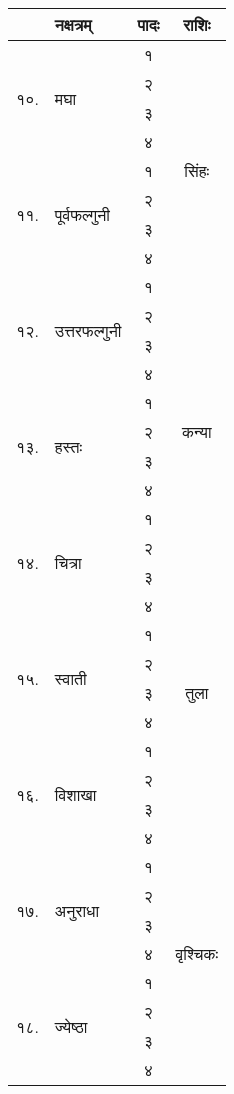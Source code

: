{\begin{tabular}{|l@{~}l|>{\tiny}c|c|}
\hline
& नक्षत्रम् & \small{पादः} & राशिः\\\hline
\multirow{4}{*}{१०.} & \multirow{4}{*}{मघा}                      & १&  \multirow{9}{*}{सिंहः}\\
&& २& \\
&& ३& \\
&& ४& \\
\cline{1-3}\multirow{4}{*}{११.} & \multirow{4}{*}{पूर्वफल्गुनी}             & १&  \\
&& २& \\
&& ३& \\
&& ४& \\
\cline{1-3}\multirow{4}{*}{१२.} & \multirow{4}{*}{उत्तरफल्गुनी}             & १&  \\
\cline{3-4} & & २&  \multirow{9}{*}{कन्या} \\
&& ३& \\
&& ४& \\
\cline{1-3}\multirow{4}{*}{१३.} & \multirow{4}{*}{हस्तः}                    & १&  \\
&& २& \\
&& ३& \\
&& ४& \\
\cline{1-3}\multirow{4}{*}{१४.} & \multirow{4}{*}{चित्रा}                   & १&   \\
&& २& \\
\cline{3-4} & & ३&  \multirow{9}{*}{तुला} \\
&& ४& \\
\cline{1-3}\multirow{4}{*}{१५.} & \multirow{4}{*}{स्वाती}                   & १&   \\
&& २& \\
&& ३& \\
&& ४& \\
\cline{1-3}\multirow{4}{*}{१६.} & \multirow{4}{*}{विशाखा}                   & १&   \\
&& २& \\
&& ३& \\
\cline{3-4} & & ४&  \multirow{9}{*}{वृश्चिकः}\\
\cline{1-3}\multirow{4}{*}{१७.} & \multirow{4}{*}{अनुराधा}                  & १&   \\
&& २& \\
&& ३& \\
&& ४& \\
\cline{1-3}\multirow{4}{*}{१८.} & \multirow{4}{*}{ज्येष्ठा}                 & १&   \\
&& २& \\
&& ३& \\
&& ४& \\
\hline


\end{tabular}}
